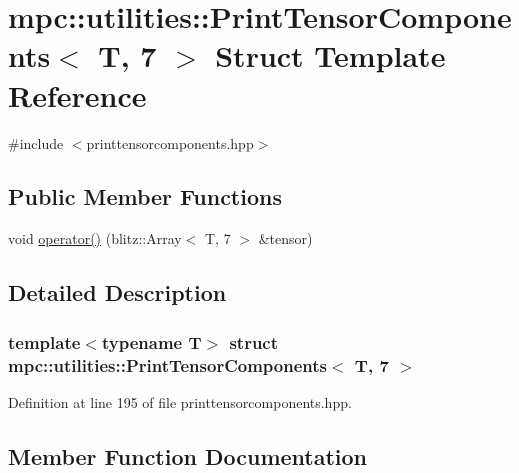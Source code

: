 \hypertarget{structmpc_1_1utilities_1_1_print_tensor_components_3_01_t_00_017_01_4}{}\section{mpc\+:\+:utilities\+:\+:Print\+Tensor\+Components$<$ T, 7 $>$ Struct Template Reference}
\label{structmpc_1_1utilities_1_1_print_tensor_components_3_01_t_00_017_01_4}


{\ttfamily \#include $<$printtensorcomponents.\+hpp$>$}

\subsection*{Public Member Functions}
\begin{DoxyCompactItemize}
\item 
void \mbox{\hyperlink{structmpc_1_1utilities_1_1_print_tensor_components_3_01_t_00_017_01_4_ac3b3749e7e1cac63277ee49dc629bf51}{operator()}} (blitz\+::\+Array$<$ T, 7 $>$ \&tensor)
\end{DoxyCompactItemize}


\subsection{Detailed Description}
\subsubsection*{template$<$typename T$>$\newline
struct mpc\+::utilities\+::\+Print\+Tensor\+Components$<$ T, 7 $>$}



Definition at line 195 of file printtensorcomponents.\+hpp.



\subsection{Member Function Documentation}
\mbox{\label{structmpc_1_1utilities_1_1_print_tensor_components_3_01_t_00_017_01_4_ac3b3749e7e1cac63277ee49dc629bf51}} 
